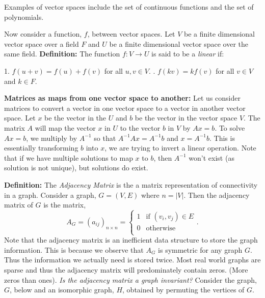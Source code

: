 \documentclass{article}
\begin{document}
Examples of vector spaces include the set of continuous functions and the set of polynomials.

\medskip \noindent Now consider a function, $f$, between vector spaces. Let $V$ be a finite dimensional vector space over a field $F$ and $U$ be a finite dimensional vector space over the same field. 
\newline \noindent \textbf{Definition:} The function $f: V \rightarrow U$ is said to be a \textit{linear} if: 
\begin{adjustwidth}{2.5em}{0pt}
1. $f(u+v)=f(u)+f(v)$ for all $u,v \in V$.
\newline {}. $f(kv) = kf(v)$ for all $v \in V$ and $k \in F$.
\end{adjustwidth}

\medskip \noindent \textbf{Matrices as maps from one vector space to another:}
Let us consider matrices to convert a vector in one vector space to a vector in another vector space. Let $x$ be the vector in the $U$ and $b$ be the vector in the vector space $V$. The matrix $A$ will map the vector $x$ in $U$ to the vector $b$ in $V$ by $Ax=b$. To solve $Ax=b$, we multiply by $A^{-1}$ so that $A^{-1}Ax=A^{-1}b$ and $x=A^{-1}b$. This is essentially transforming $b$ into $x$, we are trying to invert a linear operation. Note that if we have multiple solutions to map $x$ to $b$, then $A^{-1}$ won't exist (as solution is not unique), but solutions do exist.

\medskip \noindent \textbf{Definition:} The \textit{Adjacency Matrix} is the a matrix representation of connectivity in a graph. Consider a graph, $G=(V,E)$ where $n=|V|$. Then the adjacency matrix of $G$ is the matrix, $$A_G = (a_{ij})_{n \times n} = \begin{cases} 
      1 & \text{if } (v_i,v_j) \in E \\
      0 & \text{otherwise} \\
   \end{cases}
.$$
\noindent Note that the adjacency matrix is an inefficient data structure to store the graph information. This is because we observe that $A_G$ is symmetric for any graph $G$. Thus the information we actually need is stored twice. Most real world graphs are sparse and thus the adjacency matrix will  predominately contain zeros. (More zeros than ones).
\smallskip \newline \noindent \textit{Is the adjacency matrix a graph invariant?} Consider the graph, $G$, below and an isomorphic graph, $H$, obtained by permuting the vertices of $G$. 
\end{document}
